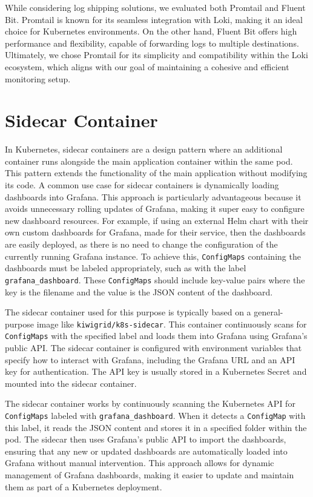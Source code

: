 While considering log shipping solutions, we evaluated both Promtail and Fluent Bit. Promtail is known for its seamless integration with Loki, making it an ideal choice for Kubernetes environments. On the other hand, Fluent Bit offers high performance and flexibility, capable of forwarding logs to multiple destinations. Ultimately, we chose Promtail for its simplicity and compatibility within the Loki ecosystem, which aligns with our goal of maintaining a cohesive and efficient monitoring setup.

\section{Sidecar Container}
In Kubernetes, sidecar containers are a design pattern where an additional container runs alongside the main application container within the same pod. This pattern extends the functionality of the main application without modifying its code. A common use case for sidecar containers is dynamically loading dashboards into Grafana. This approach is particularly advantageous because it avoids unnecessary rolling updates of Grafana, making it super easy to configure new dashboard resources. For example, if using an external Helm chart with their own custom dashboards for Grafana, made for their service, then the dashboards are easily deployed, as there is no need to change the configuration of the currently running Grafana instance. To achieve this, \texttt{ConfigMaps} containing the dashboards must be labeled appropriately, such as with the label \texttt{grafana\_dashboard}. These \texttt{ConfigMaps} should include key-value pairs where the key is the filename and the value is the JSON content of the dashboard.

The sidecar container used for this purpose is typically based on a general-purpose image like \texttt{kiwigrid/k8s-sidecar}. This container continuously scans for \texttt{ConfigMaps} with the specified label and loads them into Grafana using Grafana's public API. The sidecar container is configured with environment variables that specify how to interact with Grafana, including the Grafana URL and an API key for authentication. The API key is usually stored in a Kubernetes Secret and mounted into the sidecar container.

The sidecar container works by continuously scanning the Kubernetes API for \texttt{ConfigMaps} labeled with \texttt{grafana\_dashboard}. When it detects a \texttt{ConfigMap} with this label, it reads the JSON content and stores it in a specified folder within the pod. The sidecar then uses Grafana's public API to import the dashboards, ensuring that any new or updated dashboards are automatically loaded into Grafana without manual intervention. This approach allows for dynamic management of Grafana dashboards, making it easier to update and maintain them as part of a Kubernetes deployment.

